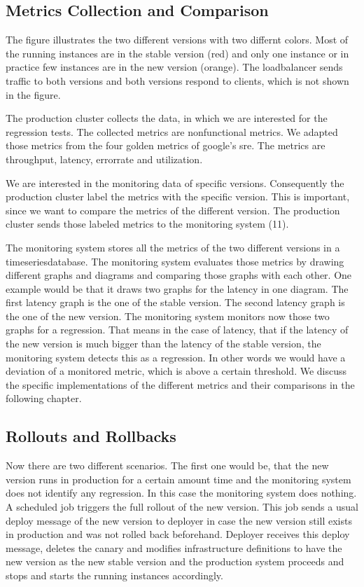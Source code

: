\subsection{Metrics Collection and Comparison}

The figure illustrates the two different versions with two differnt colors. Most of the
running instances are in the stable version (red) and only one instance or in practice few
instances are in the new version (orange). The loadbalancer sends traffic to both versions
and both versions respond to clients, which is not shown in the figure.

The production cluster collects the data, in which we are interested for the regression
tests.  The collected metrics are nonfunctional metrics. We adapted those metrics from the
four golden metrics of google's sre. The metrics are throughput, latency, errorrate and
utilization.

We are interested in the monitoring data of specific versions. Consequently the production
cluster label the metrics with the specific version. This is important, since we want to
compare the metrics of the different version.  The production cluster sends those labeled
metrics to the monitoring system (11).

The monitoring system stores all the metrics of the two different versions in a
timeseriesdatabase. The monitoring system evaluates those metrics by drawing different
graphs and diagrams and comparing those graphs with each other. One example would be that
it draws two graphs for the latency in one diagram. The first latency graph is the one of
the stable version. The second latency graph is the one of the new version. The monitoring
system monitors now those two graphs for a regression. That means in the case of latency,
that if the latency of the new version is much bigger than the latency of the stable
version, the monitoring system detects this as a regression. In other words we would have
a deviation of a monitored metric, which is above a certain threshold. We discuss the
specific implementations of the different metrics and their comparisons in the following
chapter.

\subsection{Rollouts and Rollbacks}

Now there are two different scenarios. The first one would be, that the new version runs
in production for a certain amount time and the monitoring system does not identify any
regression. In this case the monitoring system does nothing. A scheduled job triggers the
full rollout of the new version. This job sends a usual deploy message of the new version
to deployer in case the new version still exists in production and was not rolled back
beforehand. Deployer receives this deploy message, deletes the canary and modifies
infrastructure definitions to have the new version as the new stable version and the
production system proceeds and stops and starts the running instances accordingly.

